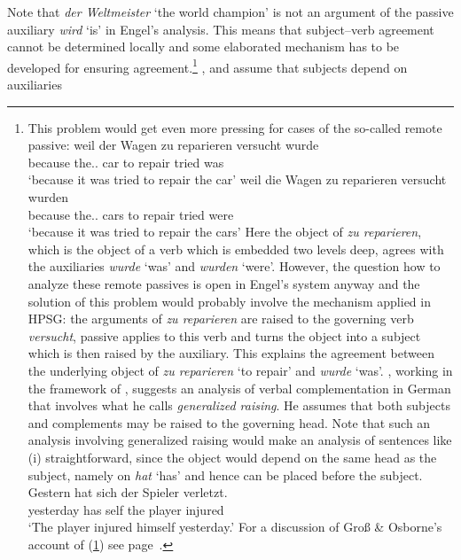 Note that \emph{der Weltmeister} `the world champion' is not an argument of the passive auxiliary
\emph{wird} `is' in Engel's analysis. This means that subject--verb agreement cannot be determined
locally and some elaborated mechanism has to be developed for ensuring agreement.\footnote{%
This problem would get even more pressing for cases of the so-called remote passive:
\eal
\ex
\gll weil der Wagen zu reparieren versucht wurde\\
     because the.\SG.\nom{} car to repair tried was\\
\glt `because it was tried to repair the car'
\ex
\gll weil die Wagen zu reparieren versucht wurden\\
     because the.\PL.\nom{} cars to repair tried were\\
\glt `because it was tried to repair the cars'
\zl
Here the object of \emph{zu reparieren}, which is the object of a verb which is embedded two levels deep,
agrees with the auxiliaries \emph{wurde} `was' and \emph{wurden} `were'. However, the question how to analyze these remote
passives is open in Engel's system anyway and the solution of this problem would probably involve the mechanism
applied in HPSG: the arguments of \emph{zu reparieren} are raised to the governing verb
\emph{versucht}, passive applies to this verb and turns the object into a subject which is then
raised by the auxiliary. This explains the agreement between the underlying object of \emph{zu
  reparieren} `to repair' and \emph{wurde} `was'. \citet{Hudson97a}, working in the framework of \wg, suggests an analysis of verbal
complementation in German that involves what he calls \emph{generalized raising}. He assumes
that both subjects and complements may be raised to the governing head. Note that such an analysis
involving generalized raising would make an analysis of sentences like (i) straightforward, since
the object would depend on the same head as the subject, namely on \emph{hat} `has' and hence can be
placed before the subject.
\ea
\label{ex-gestern-hat-sich-der-spieler-verletzt}
\gll Gestern hat sich der Spieler verletzt.\\
     yesterday has self the player injured\\
\glt `The player injured himself yesterday.'
\z
For a discussion of Groß \& Osborne's account of (\ref{ex-gestern-hat-sich-der-spieler-verletzt}) see page~\pageref{fig-gestern-hat-sich-der-spieler-verletzt-dg-rising}.
} 
\citet{Hudson90a-u}, \citet[Section~5.3]{Eroms2000a} and \citet{GO2009a} assume that subjects depend on auxiliaries
